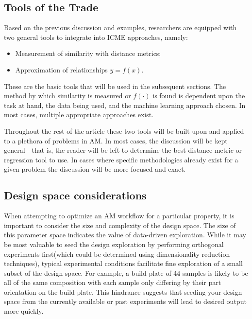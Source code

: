 \subsection{Tools of the Trade}
Based on the previous discussion and examples, researchers are equipped with two general tools to integrate into ICME approaches, namely:

\begin{itemize}
	\item Measurement of similarity with distance metrics;
	\item Approximation of relationships $y=f(x)$.
\end{itemize}

These are the basic tools that will be used in the subsequent sections.
The method by which similarity is measured or $f(\cdot)$ is found is dependent upon the task at hand, the data being used, and the machine learning approach chosen.
In most cases, multiple appropriate approaches exist.

Throughout the rest of the article these two tools will be built upon and applied to a plethora of problems in AM.
In most cases, the discussion will be kept general - that is, the reader will be left to determine the best distance metric or regression tool to use.
In cases where specific methodologies already exist for a given problem the discussion will be more focused and exact.

\subsection{Design space considerations}
\label{subsec:DMC_design_space}
When attempting to optimize an AM workflow for a particular property, it is important to consider the size and complexity of the design space.
The size of this parameter space indicates the value of data-driven exploration.
While it may be most valuable to seed the design exploration by performing orthogonal experiments first(which could be determined using dimensionality reduction techniques), typical experimental conditions facilitate fine exploration of a small subset of the design space.
For example, a build plate of 44 samples is likely to be all of the same composition with each sample only differing by their part orientation on the build plate.
This hindrance suggests that seeding your design space from the currently available or past experiments will lead to desired output more quickly.

